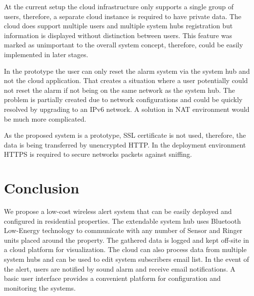 \documentclass[conference]{IEEEtran}
\begin{document}
At the current setup the cloud infrastructure only supports a single group of users, therefore, a separate cloud instance is required to have private data. The cloud does support multiple users and multiple system hubs registration but information is displayed without distinction between users. This feature was marked as unimportant to the overall system concept, therefore, could be easily implemented in later stages.

In the prototype the user can only reset the alarm system via the system hub and not the cloud application. That creates a situation where a user potentially could not reset the alarm if not being on the same network as the system hub. The problem is partially created due to network configurations and could be quickly resolved by upgrading to an IPv6 network. A solution in NAT environment would be much more complicated.

As the proposed system is a prototype, SSL certificate is not used, therefore, the data is being transferred by unencrypted HTTP. In the deployment environment HTTPS is required to secure networks packets against sniffing.

\section{Conclusion}
We propose a low-cost wireless alert system that can be easily deployed and configured in residential properties. The extendable system hub uses Bluetooth Low-Energy technology to communicate with any number of Sensor and Ringer units placed around the property. The gathered data is logged and kept off-site in a cloud platform for visualization. The cloud can also process data from multiple system hubs and can be used to edit system subscribers email list. In the event of the alert, users are notified by sound alarm and receive email notifications. A basic user interface provides a convenient platform for configuration and monitoring the systems.



\end{document}
